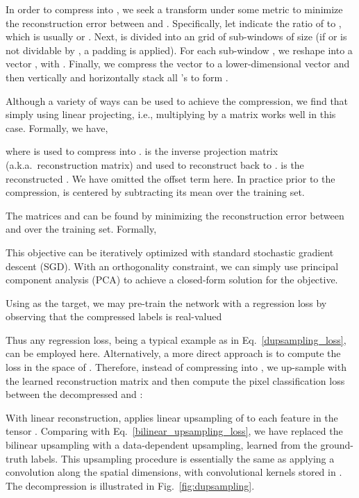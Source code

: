 \documentclass[10pt,twocolumn,letterpaper]{article}
\newcommand{\1}{{\mathbbm{1}}}
\begin{document}
In order to compress  into ,  we
seek a transform under some metric to minimize the reconstruction error between  and  .
Specifically, let  indicate the ratio of  to , which is usually  or .
Next,  is divided into an  grid of sub-windows of size  (if  or  is not dividable by , a padding is applied).
For each sub-window , we reshape  into a vector , with  .
Finally, we compress the vector   to a lower-dimensional  vector   and then vertically and horizontally stack all 's to form .

Although a variety of ways can be used to achieve the compression, we find that simply using linear projecting, i.e.,   multiplying  by a matrix  works well in this case. Formally, we have,

where  is used to compress  into .  is the inverse projection matrix (a.k.a.\ reconstruction matrix) and used to reconstruct   back to  .  is  the reconstructed . We have omitted the offset term here. In practice  prior to the compression,  is centered by subtracting its mean over the training set.


The matrices  and  can be found by minimizing the reconstruction error between  and  over the  training set. Formally,

This objective can be iteratively optimized with standard stochastic gradient descent (SGD). With an  orthogonality constraint, we can simply use principal component analysis (PCA) \cite{wold1987principal} to achieve a closed-form solution for the objective.


Using  as the target,
we may pre-train the network with a regression loss by observing that
the compressed labels  is real-valued

Thus any regression loss,  being a typical example as in Eq.~\eqref{dupsampling_loss},    can be employed here.
Alternatively,
a more direct approach is to
compute the loss in the space of . Therefore, instead of compressing  into , we up-sample   with the learned reconstruction  matrix    and then compute the pixel classification loss between the decompressed  and :

With linear reconstruction,   applies linear upsampling of  to each feature  in the tensor .
Comparing with Eq.~\eqref{bilinear_upsampling_loss},
we have replaced the bilinear upsampling with a data-dependent upsampling, learned from the ground-truth labels.
This upsampling procedure is essentially the same as applying a  convolution
along the spatial dimensions, with convolutional kernels stored in .
The decompression is illustrated in Fig.~\ref{fig:dupsampling}.
\end{document}
